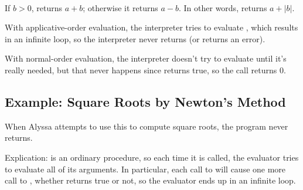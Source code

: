 \begin{exe}[1.3]
    \ \vspace{-20pt}
\end{exe}

\begin{exe}[1.4]
    If $b > 0$,  returns $a + b$; otherwise it returns 
    $a - b$. In other words,  returns $a + |b|$.
\end{exe}

\begin{exe}[1.5]
    With applicative-order evaluation, the interpreter tries to evaluate 
    , which results in an infinite loop, so the interpreter never 
    returns (or returns an error).

    With normal-order evaluation, the interpreter doesn't try to evaluate 
     until it's really needed, but that never happens since
     returns true, so the call returns 0.
\end{exe}

\subsection{Example: Square Roots by Newton’s Method}
\label{1.1.7}

\begin{exe}[1.6]
    When Alyssa attempts to use this to compute square roots, the program never 
    returns.

    Explication:  is an ordinary procedure, so each time it is 
    called, the evaluator tries to evaluate all of its arguments. In particular, 
    each call to  will cause one more call to , 
    whether  returns true or not, so the evaluator 
    ends up in an infinite loop.
\end{exe}

